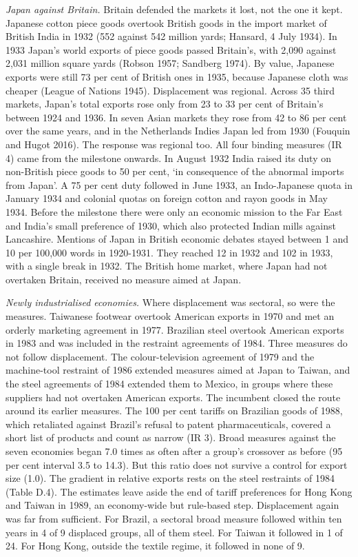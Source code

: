 \emph{Japan against Britain.} Britain defended the markets it lost, not
the one it kept. Japanese cotton piece goods overtook British goods in
the import market of British India in 1932 (552 against 542 million
yards; Hansard, 4 July 1934). In 1933 Japan's world exports of piece
goods passed Britain's, with 2,090 against 2,031 million square yards
(Robson 1957; Sandberg 1974). By value, Japanese exports were still 73
per cent of British ones in 1935, because Japanese cloth was cheaper
(League of Nations 1945). Displacement was regional. Across 35 third
markets, Japan's total exports rose only from 23 to 33 per cent of
Britain's between 1924 and 1936. In seven Asian markets they rose from
42 to 86 per cent over the same years, and in the Netherlands Indies
Japan led from 1930 (Fouquin and Hugot 2016). The response was regional
too. All four binding measures (IR 4) came from the milestone onwards.
In August 1932 India raised its duty on non-British piece goods to 50
per cent, `in consequence of the abnormal imports from Japan'. A 75 per
cent duty followed in June 1933, an Indo-Japanese quota in January 1934
and colonial quotas on foreign cotton and rayon goods in May 1934.
Before the milestone there were only an economic mission to the Far East
and India's small preference of 1930, which also protected Indian mills
against Lancashire. Mentions of Japan in British economic debates stayed
between 1 and 10 per 100,000 words in 1920-1931. They reached 12 in 1932
and 102 in 1933, with a single break in 1932. The British home market,
where Japan had not overtaken Britain, received no measure aimed at
Japan.

\emph{Newly industrialised economies.} Where displacement was sectoral,
so were the measures. Taiwanese footwear overtook American exports in
1970 and met an orderly marketing agreement in 1977. Brazilian steel
overtook American exports in 1983 and was included in the restraint
agreements of 1984. Three measures do not follow displacement. The
colour-television agreement of 1979 and the machine-tool restraint of
1986 extended measures aimed at Japan to Taiwan, and the steel
agreements of 1984 extended them to Mexico, in groups where these
suppliers had not overtaken American exports. The incumbent closed the
route around its earlier measures. The 100 per cent tariffs on Brazilian
goods of 1988, which retaliated against Brazil's refusal to patent
pharmaceuticals, covered a short list of products and count as narrow
(IR 3). Broad measures against the seven economies began 7.0 times as
often after a group's crossover as before (95 per cent interval 3.5 to
14.3). But this ratio does not survive a control for export size (1.0).
The gradient in relative exports rests on the steel restraints of 1984
(Table D.4). The estimates leave aside the end of tariff preferences for
Hong Kong and Taiwan in 1989, an economy-wide but rule-based step.
Displacement again was far from sufficient. For Brazil, a sectoral broad
measure followed within ten years in 4 of 9 displaced groups, all of
them steel. For Taiwan it followed in 1 of 24. For Hong Kong, outside
the textile regime, it followed in none of 9.

